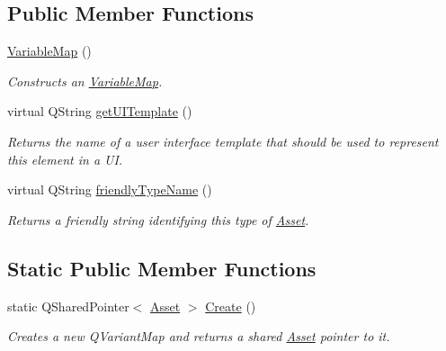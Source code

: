 \subsection*{Public Member Functions}
\begin{DoxyCompactItemize}
\item 
\hyperlink{class_picto_1_1_variable_map_ac315aa0dfcb6df14d419d70c5970489a}{Variable\-Map} ()
\begin{DoxyCompactList}\small\item\em Constructs an \hyperlink{class_picto_1_1_variable_map}{Variable\-Map}. \end{DoxyCompactList}\item 
\hypertarget{class_picto_1_1_variable_map_ad0266cc8bf4ee3cffffdd6b9a4d4f477}{virtual Q\-String \hyperlink{class_picto_1_1_variable_map_ad0266cc8bf4ee3cffffdd6b9a4d4f477}{get\-U\-I\-Template} ()}\label{class_picto_1_1_variable_map_ad0266cc8bf4ee3cffffdd6b9a4d4f477}

\begin{DoxyCompactList}\small\item\em Returns the name of a user interface template that should be used to represent this element in a U\-I. \end{DoxyCompactList}\item 
virtual Q\-String \hyperlink{class_picto_1_1_variable_map_a56de651ffd82d88346309a4bfee6bd85}{friendly\-Type\-Name} ()
\begin{DoxyCompactList}\small\item\em Returns a friendly string identifying this type of \hyperlink{class_picto_1_1_asset}{Asset}. \end{DoxyCompactList}\end{DoxyCompactItemize}
\subsection*{Static Public Member Functions}
\begin{DoxyCompactItemize}
\item 
\hypertarget{class_picto_1_1_variable_map_a5adc5441f5700fbd778fff6bf380dc08}{static Q\-Shared\-Pointer$<$ \hyperlink{class_picto_1_1_asset}{Asset} $>$ \hyperlink{class_picto_1_1_variable_map_a5adc5441f5700fbd778fff6bf380dc08}{Create} ()}\label{class_picto_1_1_variable_map_a5adc5441f5700fbd778fff6bf380dc08}

\begin{DoxyCompactList}\small\item\em Creates a new Q\-Variant\-Map and returns a shared \hyperlink{class_picto_1_1_asset}{Asset} pointer to it. \end{DoxyCompactList}\end{DoxyCompactItemize}

